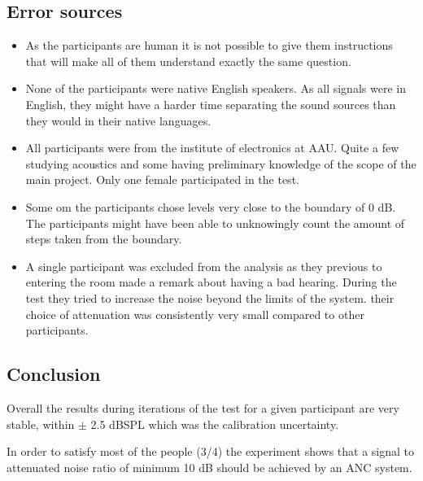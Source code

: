 \subsection{Error sources} \label{SubSec:ErrSouNoiAtt}
\begin{itemize}
\item As the participants are human it is not possible to give them instructions that will make all of them understand exactly the same question. 
\item None of the participants were native English speakers. As all signals were in English, they might have a harder time separating the sound sources than they would in their native languages. 
\item All participants were from the institute of electronics at AAU. Quite a few studying acoustics and some having preliminary knowledge of the scope of the main project. Only one female participated in the test.
\item Some om the participants chose levels very close to the boundary of 0 dB. The participants might have been able to unknowingly count the amount of steps taken from the boundary.  
\item A single participant was excluded from the analysis as they previous to entering the room made a remark about having a bad hearing. During the test they tried to increase the noise beyond the limits of the system. their choice of attenuation was consistently very small compared to other participants.
\end{itemize}

\subsection{Conclusion}
Overall the results during iterations of the test for a given participant are very stable, within $\pm$ 2.5 dBSPL which was the calibration uncertainty. 

In order to satisfy most of the people (3/4) the experiment shows that a signal to attenuated noise ratio of minimum 10 dB should be achieved by an ANC system.  





